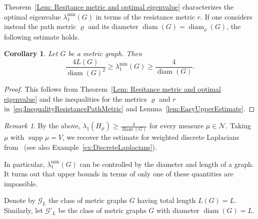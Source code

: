 \documentclass[reqno]{amsart}
\theoremstyle{plain}
\newtheorem{cor}[thm]{Corollary}
\theoremstyle{definition}
\theoremstyle{remark}
\newtheorem{rmk}[thm]{Remark}
\numberwithin{equation}{section}
\newcommand{\cN}{\mathcal{N}}
\newcommand{\supp}{\operatorname{supp}}
\newcommand{\diam}{\operatorname{diam}}
\begin{document}
Theorem~\ref{Lem: Resitance metric and optimal eigenvalue} characterizes the optimal eigenvalue $\lambda_1^{\min}(G)$ in terms of the resistance metric $r$. If one considers instead the path metric $\varrho$ and its diameter $\diam(G) =\diam_\varrho(G)$, the following estimate holds.
\begin{cor}\label{Cor: First bounds for lambda1}
	Let $G$ be a metric graph. Then
	\begin{equation} \label{eq:Lambda1PathMetricDiameter}
		\frac{4L(G)}{\diam(G)^2} \geq \lambda_1^{\min}(G) \geq \frac{4}{ \diam(G)}.
	\end{equation}
\end{cor}
\begin{proof}
	This follows from Theorem~\ref{Lem: Resitance metric and optimal eigenvalue} and the inequalities for the metrics $\varrho$ and $r$ in~\eqref{eq:InequalityResistancePathMetric} and Lemma~\ref{lem:EasyUpperEstimate}.
\end{proof}
\begin{rmk}
By the above, $\lambda_1(H_\mu) \ge \frac{4}{\diam(G)}$ for every measure $\mu \in \cN$. Taking $\mu$ with $\supp \mu=V$, we recover the estimate for weighted discrete Laplacians from~\cite[Corollary 3.7]{lss} (see also Example~\ref{ex:DiscreteLaplacians}).
\end{rmk}

In particular, $\lambda_1^{\min}(G)$ can be controlled by the diameter and length of a graph. It turns out that upper bounds in terms of only one of these quantities are impossible.

Denote by $\mathscr{G}_L$ the class of metric graphs $G$ having total length $L(G) = L$. Similarly, let $\mathscr{G}'_L$ be the class of metric graphs $G$ with diameter $\diam(G) = L$.
\end{document}
